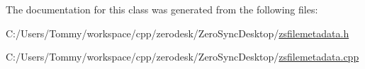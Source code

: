 The documentation for this class was generated from the following files\-:\begin{DoxyCompactItemize}
\item 
C\-:/\-Users/\-Tommy/workspace/cpp/zerodesk/\-Zero\-Sync\-Desktop/\hyperlink{zsfilemetadata_8h}{zsfilemetadata.\-h}\item 
C\-:/\-Users/\-Tommy/workspace/cpp/zerodesk/\-Zero\-Sync\-Desktop/\hyperlink{zsfilemetadata_8cpp}{zsfilemetadata.\-cpp}\end{DoxyCompactItemize}

